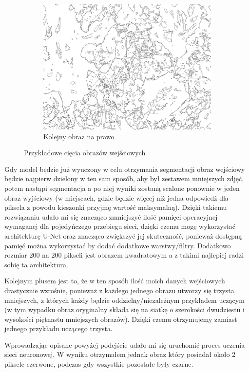 \documentclass{article}
\begin{document}
\begin{figure}[H]
    \begin{subfigure}{0.4\linewidth}
        \includegraphics[width=\linewidth]{images/output.jpg}
        \caption{Kolejny obraz na prawo}
    \end{subfigure}
    \caption{Przykładowe cięcia obrazów wejściowych}
    \label{fig:input_split}
\end{figure}
Gdy model będzie już wyuczony w celu otrzymania segmentacji obraz wejściowy będzie najpierw dzielony w ten sam sposób, aby był zestawem mniejszych zdjęć, potem nastąpi segmentacja a po niej wyniki zostaną scalone ponownie w jeden obraz wyjściowy (w miejscach, gdzie będzie więcej niż jedna odpowiedź dla piksela z powodu kieszonki przyjmę wartość maksymalną).
Dzięki takiemu rozwiązaniu udało mi się znacząco zmniejszyć ilość pamięci operacyjnej wymaganej dla pojedyńczego przebiegu sieci, dzięki czemu mogę wykorzystać architekturę U-Net oraz znacząco zwiększyć jej skuteczność, ponieważ dostępną pamięć można wykorzystać by dodać dodatkowe warstwy/filtry.
Dodatkowo rozmiar 200 na 200 pikseli jest obrazem kwadratowym a z takimi najlepiej radzi sobię ta architektura.

Kolejnym plusem jest to, że w ten sposób ilość moich danych wejściowych drastycznie wzrośnie, ponieważ z każdego jednego obrazu utworzy się trzysta mniejszych, z których każdy będzie oddzielny/niezależnym przykładem uczącym (w tym wypadku obraz oryginalny składa się na siatkę o szerokości dwudziestu i wysokości piętnastu mniejszych obrazów).
Dzięki czemu otrzymujemy zamiast jednego przykładu uczącego trzysta.

Wprowadzając opisane powyżej podejście udało mi się uruchomić proces uczenia sieci neuronowej.
W wyniku otrzymałem jednak obraz który posiadał około 2 piksele czerwone, podczas gdy wszystkie pozostałe były czarne.
\end{document}
